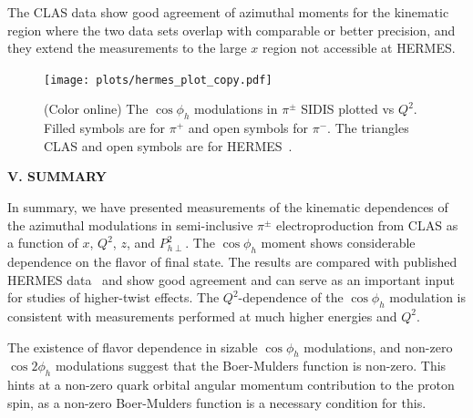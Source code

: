 \documentclass[aps,prl,twocolumn,showpacs,superscriptaddress,groupedaddress]{revtex4-1}  %
\newcommand{\Phperp}{P_{h\perp}}
\newcommand{\xbj}{x}
\begin{document}
The CLAS data show good agreement of azimuthal moments for the kinematic region where the two data sets overlap with comparable or better precision, and they extend the measurements to the large $\xbj$ region not accessible at HERMES.
\begin{figure}[h]
\begin{center}
\texttt{[image: plots/hermes\_plot\_copy.pdf]}
\end{center}
\caption{(Color online) The $\cos\phi_h$ modulations in $\pi^\pm$ SIDIS plotted vs $Q^2$. Filled symbols are for $\pi^+$ and open symbols for $\pi^-$.
The triangles CLAS and open symbols are for HERMES~\cite{Airapetian:2012yg}.}
\label{fig:clas-hermes}
\end{figure}


\begin{center}
\textbf{V. SUMMARY} \par
\end{center}
In summary, we have presented measurements of the kinematic dependences of the azimuthal modulations in semi-inclusive $\pi ^\pm$ electroproduction from CLAS as a function of $\xbj$, $Q^2$, $z$, and $\Phperp^2$.
The $\cos \phi_h$ moment shows considerable dependence on the flavor of final state.
The results are compared with published HERMES data~\cite{Airapetian:2012yg} and
show good agreement and can serve as an important input for studies of higher-twist effects.
The $Q^2$-dependence of the $\cos\phi_h$ modulation is consistent with measurements performed at much higher energies and $Q^2$.

The existence of flavor dependence in sizable $\cos\phi_h$ modulations, and non-zero $\cos 2 \phi_h$ modulations suggest that the Boer-Mulders function is non-zero.
This hints at a non-zero quark orbital angular momentum contribution to the proton spin, as a non-zero Boer-Mulders function is a necessary condition for this.
\end{document}
